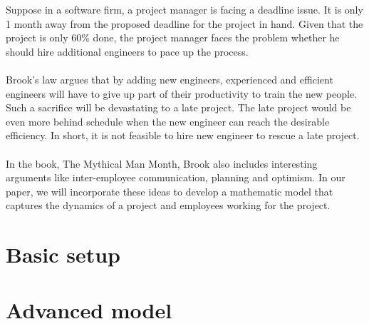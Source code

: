 \documentclass{article}
\begin{document}
Suppose in a software firm, a project manager is facing a deadline issue. It is only 1 month away from the proposed deadline for the project in hand. Given that the project is only 60\% done, the project manager faces the problem whether he should hire additional engineers to pace up the process.\\\\
Brook’s law argues that by adding new engineers, experienced and efficient engineers will have to give up part of their productivity to train the new people. Such a sacrifice will be devastating to a late project. The late project would be even more behind schedule when the new engineer can reach the desirable efficiency. In short, it is not feasible to hire new engineer to rescue a late project.\\\\
In the book, The Mythical Man Month, Brook also includes interesting arguments like inter-employee communication, planning and optimism. In our paper, we will incorporate these ideas to develop a mathematic model that captures the dynamics of a project and employees working for the project.

\section*{Basic setup}

\section*{Advanced model}
\end{document}
